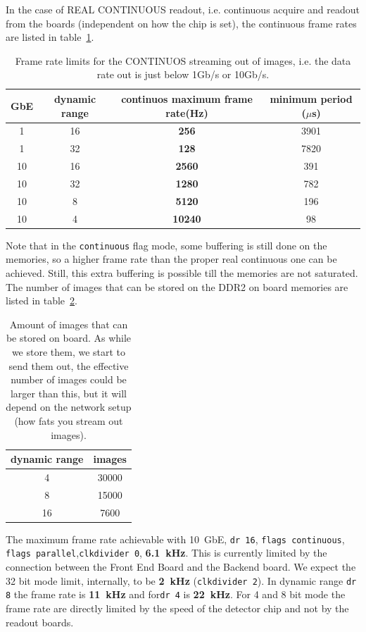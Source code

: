 \documentclass{article}
\begin{document}
In the case of REAL CONTINUOUS readout, i.e. continuous acquire and readout from the boards (independent on how the chip is set), the continuous frame rates are listed in table~\ref{tcont}.
\begin{table} 
\begin{tabular}{|c|c|c|c|}
\hline
GbE & dynamic range & continuos maximum frame rate(Hz) & minimum period ($\mu$s)\\
\hline
1 & 16 &  \textbf{256} & 3901\\ 
\hline 
1 &  32 &  \textbf{128} & 7820\\
\hline 
10 & 16 & \textbf{2560} & 391\\  
\hline 
10 & 32 & \textbf{1280}& 782\\  
\hline 
10 & 8 & \textbf{5120} & 196\\
\hline
10 & 4 & \textbf{10240} & 98\\
\hline
\end{tabular}
\caption{Frame rate limits for the CONTINUOS streaming out of images, i.e. the data rate out is just below 1Gb/s or 10Gb/s.} 
\label{tcont}\end{table}
 Note that in the {\tt{continuous}} flag mode, some buffering is still done on the memories, so a higher frame rate than the proper real continuous one can be achieved. Still, this extra buffering is possible till the memories are not saturated. The number of images that can be stored on the DDR2 on board memories are listed in table~\ref{timgs}.
\begin{table}
\begin{tabular}{|c|c|}
\hline
dynamic range & images\\
\hline
4 & 30000\\
\hline
8 & 15000\\
\hline
16 & 7600\\
\hline
\end{tabular}
\caption{Amount of images that can be stored on board. As while we store them, we start to send them out, the effective number of images could be larger than this, but it will depend on the network setup (how fats you stream out images).}
\label{timgs}
\end{table}

The maximum frame rate achievable with 10~GbE, {\tt{dr 16}}, {\tt{flags continuous}}, {\tt{flags parallel}},{\tt{clkdivider 0}}, \textbf{6.1~kHz}. This is currently limited by the connection between the Front End Board and the Backend board. We expect the 32 bit mode limit, internally, to be \textbf{2~kHz} ({\tt{clkdivider 2}}).
 In dynamic range {\tt{dr 8}} the frame rate is \textbf{11~kHz} and for{\tt{dr 4}} is \textbf{22~kHz}. For 4 and 8 bit mode the frame rate are directly limited by the speed of the detector chip and not by the readout boards.    
\end{document}
